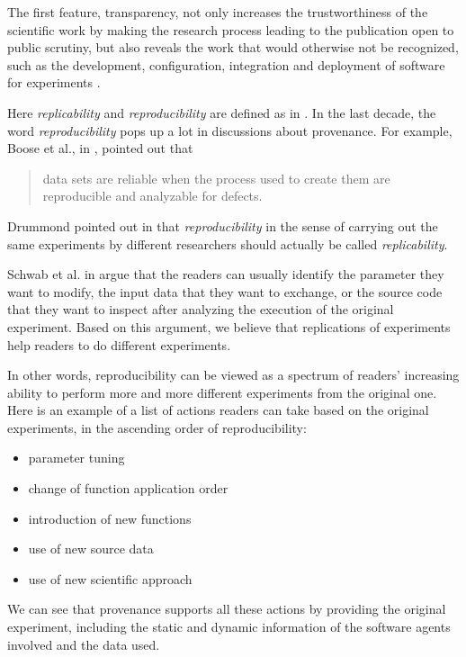The first feature, transparency, not only increases the trustworthiness of the scientific work by making the research process leading to the publication open to public scrutiny, but also reveals the work that would otherwise not be recognized, such as the development, configuration, integration and deployment of software for experiments \cite{goble2014better}.

Here \emph{replicability} and \emph{reproducibility} are defined as in \cite{drummond2009replicability}. In the last decade, the word \emph{reproducibility} pops up a lot in discussions about provenance. For example, 
Boose et al., in \cite{boose2007ensuring}, pointed out that
\begin{quote}data sets are reliable when the process used to create them are reproducible and analyzable for defects.\end{quote}
Drummond pointed out in \cite{drummond2009replicability} that \emph{reproducibility} in the sense of carrying out the same experiments by different researchers should actually be called \emph{replicability}.

Schwab et al. in \cite{schwab2000making} argue that the readers can usually identify the parameter they want to modify, the input data that they want to exchange, or the source code that they want to inspect after analyzing the execution of the original experiment. Based on this argument, we believe that replications of experiments help readers to do different experiments.

In other words, reproducibility can be viewed as a spectrum of readers' increasing ability to perform more and more different experiments from the original one. Here is an example of a list of actions readers can take based on the original experiments, in the ascending order of reproducibility:
\begin{itemize}
\item parameter tuning
\item change of function application order
\item introduction of new functions
\item use of new source data
\item use of new scientific approach
\end{itemize}
We can see that provenance supports all these actions by providing the original experiment, including the static and dynamic information of the software agents involved and the data used.


